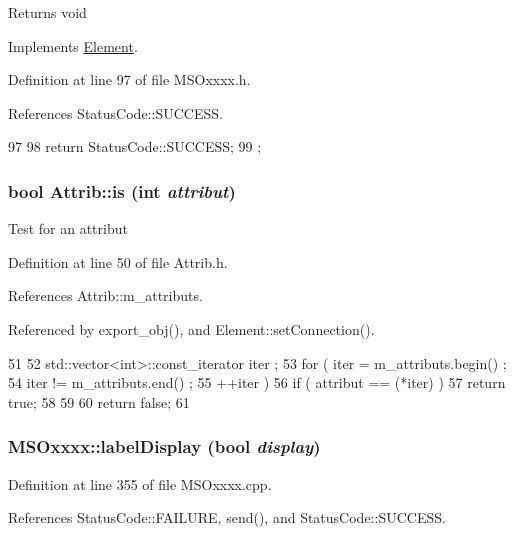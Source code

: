 \begin{DoxyReturn}{Returns}
void 
\end{DoxyReturn}


Implements \hyperlink{classElement_af42754b5cabc198869222725218d695c}{Element}.

Definition at line 97 of file MSOxxxx.h.

References StatusCode::SUCCESS.


\begin{DoxyCode}
97                     {
98     return StatusCode::SUCCESS;
99   };
\end{DoxyCode}
\hypertarget{classAttrib_a704f26af560909ad22065083bb7d4c34}{
\subsubsection[{is}]{\setlength{\rightskip}{0pt plus 5cm}bool Attrib::is (int {\em attribut})}}
\label{classAttrib_a704f26af560909ad22065083bb7d4c34}
Test for an attribut 

Definition at line 50 of file Attrib.h.

References Attrib::m\_\-attributs.

Referenced by export\_\-obj(), and Element::setConnection().


\begin{DoxyCode}
51   {
52     std::vector<int>::const_iterator iter ;
53     for ( iter  = m_attributs.begin() ;
54           iter != m_attributs.end()   ;
55           ++iter ) {
56       if ( attribut == (*iter) ) {
57         return true;
58       }
59     }
60     return false;
61   }
\end{DoxyCode}
\hypertarget{classMSOxxxx_ade4192f09f150be8b9c7c081ce1a1870}{
\subsubsection[{labelDisplay}]{ MSOxxxx::labelDisplay (bool {\em display})}}
\label{classMSOxxxx_ade4192f09f150be8b9c7c081ce1a1870}


Definition at line 355 of file MSOxxxx.cpp.

References StatusCode::FAILURE, send(), and StatusCode::SUCCESS.


